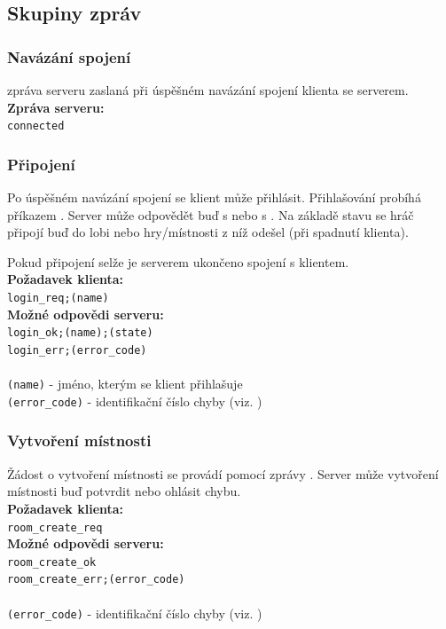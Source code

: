 \documentclass[12pt, a4paper]{article} %
\begin{document}
	\subsection{Skupiny zpráv}
	\subsubsection{Navázání spojení}
	\par {} zpráva serveru zaslaná při úspěšném navázání spojení klienta se serverem.\\
	\textbf{Zpráva serveru:}\\
	\texttt{connected}\\
	\subsubsection{Připojení}
	\par Po úspěšném navázání spojení se klient může přihlásit. Přihlašování probíhá příkazem  . Server může odpovědět buď s  nebo s . Na základě stavu se hráč připojí buď do lobi nebo hry/místnosti z níž odešel (při spadnutí klienta).\\
	\par Pokud připojení selže je serverem ukončeno spojení s klientem.\\
	\textbf{Požadavek klienta:}\\
	\texttt{login\_req;(name)}\\
	\textbf{Možné odpovědi serveru:}\\
	\texttt{login\_ok;(name);(state)}\\
	\texttt{login\_err;(error\_code)}\\\\
	\texttt{(name)} - jméno, kterým se klient přihlašuje\\
	\texttt{(error\_code)} - identifikační číslo chyby (viz. )
	
	\subsubsection{Vytvoření místnosti}
	\par Žádost o vytvoření místnosti se provádí pomocí zprávy . Server může vytvoření místnosti buď potvrdit nebo ohlásit chybu.\\
	\textbf{Požadavek klienta:}\\
	\texttt{room\_create\_req}\\
	\textbf{Možné odpovědi serveru:}\\
	\texttt{room\_create\_ok}\\
	\texttt{room\_create\_err;(error\_code)}\\\\
	\texttt{(error\_code)} - identifikační číslo chyby (viz. )
\end{document}
